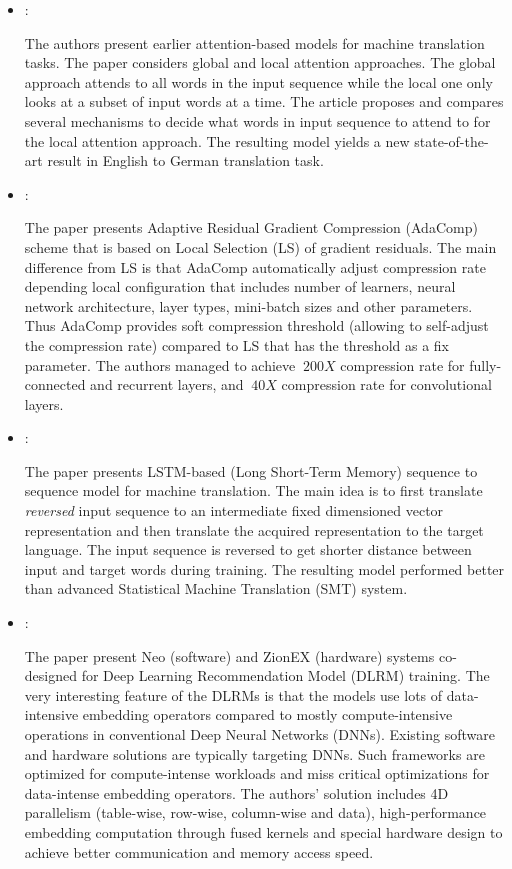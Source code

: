 \begin{itemize}
    \item \cite{Luong:AttentionNMT:2015}:

    The authors present earlier attention-based models for machine translation tasks. The paper considers global and local attention approaches. The global approach attends to all words in the input sequence while the local one only looks at a subset of input words at a time. The article proposes and compares several mechanisms to decide what words in input sequence to attend to for the local attention approach. The resulting model yields a new state-of-the-art result in English to German translation task.

    \item \cite{Chen:AdaComp:2018}:

    The paper presents Adaptive Residual Gradient Compression (AdaComp) scheme that is based on Local Selection (LS) of gradient residuals. The main difference from LS is that AdaComp automatically adjust compression rate depending local configuration that includes number of learners, neural network architecture, layer types, mini-batch sizes and other parameters. Thus AdaComp provides soft compression threshold (allowing to self-adjust the compression rate) compared to LS that has the threshold as a fix parameter. The authors managed to achieve $~200X$ compression rate for fully-connected and recurrent layers, and $~40X$ compression rate for convolutional layers.

    \item \cite{Sutskever:Seq2seq:2014}:

    The paper presents LSTM-based (Long Short-Term Memory) sequence to sequence model for machine translation. The main idea is to first translate \textit{reversed} input sequence to an intermediate fixed dimensioned vector representation and then translate the acquired representation to the target language. The input sequence is reversed to get shorter distance between input and target words during training. The resulting model performed better than advanced Statistical Machine Translation (SMT) system.

    \item \cite{Mudigere:MetaDLRMTraining:2022}:

    The paper present Neo (software) and ZionEX (hardware) systems co-designed for Deep Learning Recommendation Model (DLRM) training. The very interesting feature of the DLRMs is that the models use lots of data-intensive embedding operators compared to mostly compute-intensive operations in conventional Deep Neural Networks (DNNs). Existing software and hardware solutions are typically targeting DNNs. Such frameworks are optimized for compute-intense workloads and miss critical optimizations for data-intense embedding operators. The authors' solution includes 4D parallelism (table-wise, row-wise, column-wise and data), high-performance embedding computation through fused kernels and special hardware design to achieve better communication and memory access speed.


\end{itemize}
